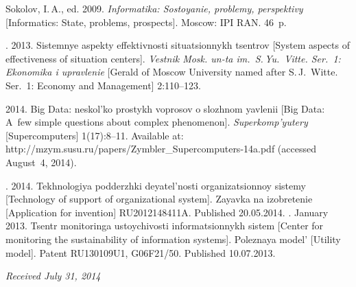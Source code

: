   \begin{multicols}{2}

\renewcommand{\bibname}{\protect\rmfamily References}

{\small\frenchspacing
 {%
 \begin{thebibliography}{9}




Sokolov, I.\,A., ed. 2009.
\textit{Informatika: Sostoyanie, problemy, perspektivy}
[Informatics: State, problems, prospects].
Moscow: IPI RAN. 46~p.


.
2013. Sistemnye aspekty effektivnosti situatsionnykh tsentrov
[System aspects of effectiveness of situation centers].
\textit{Vestnik Mosk. un-ta im.\ S.\,Yu.~Vitte. Ser.~1:
Ekonomika i upravlenie}
[Gerald of Moscow University named after S.\,J.~Witte. Ser.~1: Economy and Management]
2:110--123.

  2014. Big Data:
 neskol'ko prostykh voprosov o slozhnom yavlenii
 [Big Data: A~few simple questions about complex phenomenon].
 \textit{Superkomp'yutery} [Supercomputers] 1(17):8--11.
 Available at: {\sf http://\linebreak mzym.susu.ru/papers/Zymbler\_Supercomputers-14a.pdf}
 (accessed August~4, 2014).

.
2014. Tekhnologiya podderzhki deyatel'nosti organizatsionnoy sistemy
[Technology of support of organizational system]. Zayavka na izobretenie
[Application for invention] RU2012148411A. Published 20.05.2014.
.
January 2013. Tsentr monitoringa ustoychivosti informatsionnykh sistem
[Center for monitoring the sustainability of information systems].
Poleznaya model' [Utility model]. Patent RU130109U1, G06F21/50.
Published 10.07.2013.
\end{thebibliography}

 }
 }

\end{multicols}

\vspace*{-6pt}

\hfill{\small\textit{Received July 31, 2014}}

\vspace*{-18pt}

